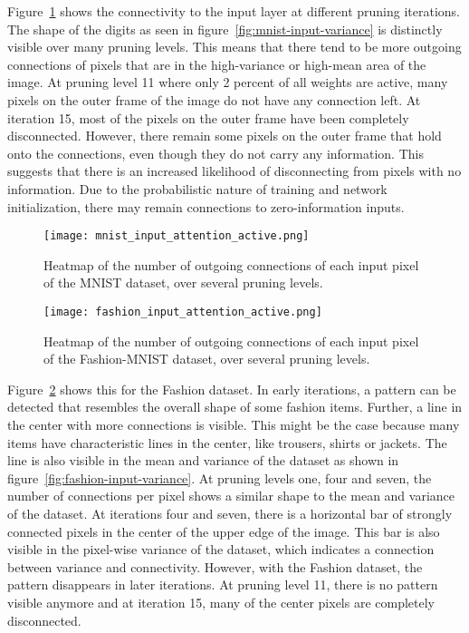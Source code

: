 Figure~\ref{fig:mnist-heatmap} shows the connectivity to the input layer at different pruning iterations.
The shape of the digits as seen in figure~\ref{fig:mnist-input-variance} is distinctly visible over many pruning levels.
This means that there tend to be more outgoing connections of pixels that are in the high-variance or high-mean area of the image.
At pruning level 11 where only 2 percent of all weights are active, many pixels on the outer frame of the image do not have any connection left.
At iteration 15, most of the pixels on the outer frame have been completely disconnected.
However, there remain some pixels on the outer frame that hold onto the connections, even though they do not carry any information.
This suggests that there is an increased likelihood of disconnecting from pixels with no information.
Due to the probabilistic nature of training and network initialization, there may remain connections to zero-information inputs.

\begin{figure}[!htb] %
    \centering\texttt{[image: mnist\_input\_attention\_active.png]}
    \caption[Pixel connectivity MNIST]{
        Heatmap of the number of outgoing connections of each input pixel of the MNIST dataset, over several pruning levels.
        }\label{fig:mnist-heatmap}
\end{figure}
\begin{figure}[!htb] %
    \centering\texttt{[image: fashion\_input\_attention\_active.png]}
    \caption[Pixel connectivity Fashion-MNIST]{
        Heatmap of the number of outgoing connections of each input pixel of the Fashion-MNIST dataset, over several pruning levels.
        }\label{fig:fashion-heatmap}
\end{figure}

Figure~\ref{fig:fashion-heatmap} shows this for the Fashion dataset.
In early iterations, a pattern can be detected that resembles the overall shape of some fashion items.
Further, a line in the center with more connections is visible.
This might be the case because many items have characteristic lines in the center, like trousers, shirts or jackets.
The line is also visible in the mean and variance of the dataset as shown in figure~\ref{fig:fashion-input-variance}.
At pruning levels one, four and seven, the number of connections per pixel shows a similar shape to the mean and variance of the dataset.
At iterations four and seven, there is a horizontal bar of strongly connected pixels in the center of the upper edge of the image. 
This bar is also visible in the pixel-wise variance of the dataset, which indicates a connection between variance and connectivity.
However, with the Fashion dataset, the pattern disappears in later iterations.
At pruning level 11, there is no pattern visible anymore and at iteration 15, many of the center pixels are completely disconnected.

